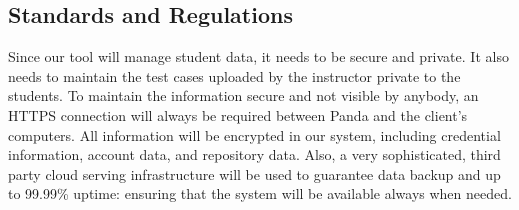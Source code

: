 \subsection{Standards and Regulations}

Since our tool will manage student data, it needs to be secure and private. It
also needs to maintain the test cases uploaded by the instructor private to the
students. To maintain the information secure and not visible by anybody, an
HTTPS connection will always be required between Panda and the client's
computers. All information will be encrypted in our system, including credential
information, account data, and repository data. Also, a very sophisticated,
third party cloud serving infrastructure will be used to guarantee data backup
and up to 99.99\% uptime: ensuring that the system will be available always when
needed.

